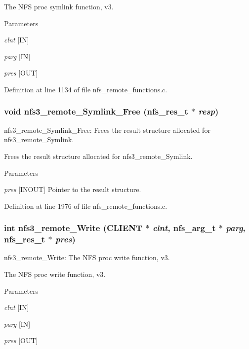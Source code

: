 The NFS proc symlink function, v3.


\begin{DoxyParams}{Parameters}
\item[{\em clnt}][IN] \item[{\em parg}][IN] \item[{\em pres}][OUT] \end{DoxyParams}


Definition at line 1134 of file nfs\_\-remote\_\-functions.c.
\subsubsection[{nfs3\_\-remote\_\-Symlink\_\-Free}]{\setlength{\rightskip}{0pt plus 5cm}void nfs3\_\-remote\_\-Symlink\_\-Free (nfs\_\-res\_\-t $\ast$ {\em resp})}\label{group__NFSprocs_gacc972c9c7613f4dc1e430e069439974d}
nfs3\_\-remote\_\-Symlink\_\-Free: Frees the result structure allocated for nfs3\_\-remote\_\-Symlink.

Frees the result structure allocated for nfs3\_\-remote\_\-Symlink.


\begin{DoxyParams}{Parameters}
\item[{\em pres}][INOUT] Pointer to the result structure. \end{DoxyParams}


Definition at line 1976 of file nfs\_\-remote\_\-functions.c.
\subsubsection[{nfs3\_\-remote\_\-Write}]{\setlength{\rightskip}{0pt plus 5cm}int nfs3\_\-remote\_\-Write (CLIENT $\ast$ {\em clnt}, \/  nfs\_\-arg\_\-t $\ast$ {\em parg}, \/  nfs\_\-res\_\-t $\ast$ {\em pres})}\label{group__NFSprocs_gad46e3eae09a4f696a6b27defd87ed22f}
nfs3\_\-remote\_\-Write: The NFS proc write function, v3.

The NFS proc write function, v3.


\begin{DoxyParams}{Parameters}
\item[{\em clnt}][IN] \item[{\em parg}][IN] \item[{\em pres}][OUT] \end{DoxyParams}


